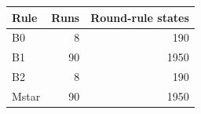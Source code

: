 \begin{tabular}{lrr}
\toprule
Rule & Runs & Round-rule states \\
\midrule
B0 & 8 & 190 \\
B1 & 90 & 1950 \\
B2 & 8 & 190 \\
Mstar & 90 & 1950 \\
\bottomrule
\end{tabular}

